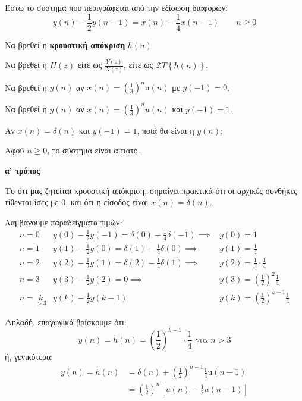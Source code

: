 \documentclass[11pt,a4paper,notitlepage,fleqn]{article}
\begin{document}
\begin{exercise}
	Έστω το σύστημα που περιγράφεται από την εξίσωση διαφορών:
	\[
	y(n) - \frac{1}{2}y(n-1) = x(n) - \frac{1}{4}x(n-1) \qquad n\geq0
	\]
	
	\begin{enumpar}
		\item Να βρεθεί η \textbf{κρουστική απόκριση} \( h(n) \)
		\item Να βρεθεί η \( H(z)\) είτε ως \( \frac{Y(z)}{X(z)} \), είτε ως \( \mathcal{Z}T\left\lbrace h(n) \right\rbrace \).
		\item Να βρεθεί η \( y(n) \) αν \( \displaystyle x(n) = \left(\frac{1}{3}\right)^n \mathrm{u}(n) \) με \( y(-1) = 0 \).
		\item Να βρεθεί η \( y(n) \) αν \( x(n) = \left(\frac{1}{3}\right)^n u(n) \) και
		\( y(-1) = 1 \).
		\item Αν \( x(n) = δ(n) \) και \( y(-1) = 1 \), ποιά θα είναι η \( y(n) \);
	\end{enumpar}
	\tcblower
	Αφού \( n \geq 0 \), το σύστημα είναι αιτιατό.
	\begin{enumpar}
		\item
		\begin{enumgreekpar}
			\item \textbf{α' τρόπος}
			
			Το ότι μας ζητείται κρουστική απόκριση, σημαίνει πρακτικά ότι οι αρχικές συνθήκες τίθενται ίσες με 0, και ότι η είσοδος είναι \( x(n)=δ(n) \).
			
			Λαμβάνουμε παραδείγματα τιμών:\[
			\begin{array}{crl}
			n=0 & y(0)-\frac{1}{2}y(-1)=\delta(0)-\frac{1}{4}δ(-1) \implies & y(0)=1\\
			n=1 & y(1)-\frac{1}{2}y(0) =δ(1)-\frac{1}{4}δ(0)\implies & y(1)=\frac{1}{4}\\
			n=2 & y(2)-\frac{1}{2}y(1) = δ(2)-\frac{1}{4}δ(1)\implies & y(2) = \frac{1}{2}\cdot\frac{1}{4}\\
			n=3 & y(3)-\frac{1}{2}y(2) = 0 \implies & y(3) = \left(\frac{1}{2}\right)^{2}\frac{1}{4}\\
			n=\underset{>3}{k} & y(k)-\frac{1}{2}y(k-1) & y(k) = \left(\frac{1}{2}\right)^{k-1}\frac{1}{4}
			\end{array}
			\]
			
			Δηλαδή, επαγωγικά βρίσκουμε ότι:
			\[
			y(n) = h(n) = \left(\frac{1}{2}\right)^{k-1} \cdot \frac{1}{4} \text{ για } n>3
			\]
			ή, γενικότερα:
			\begin{align*}
			y(n) = h(n) &= δ(n) + \left(\frac{1}{2}\right)^{n-1}\frac{1}{4}\mathrm{u}(n-1)
			\\ &= \left(\frac{1}{2}\right)^n\left[u(n) - \frac{1}{2}u(n-1)\right]
			\end{align*}
			

\end{enumgreekpar}
\end{enumpar}
\end{exercise}
\end{document}
